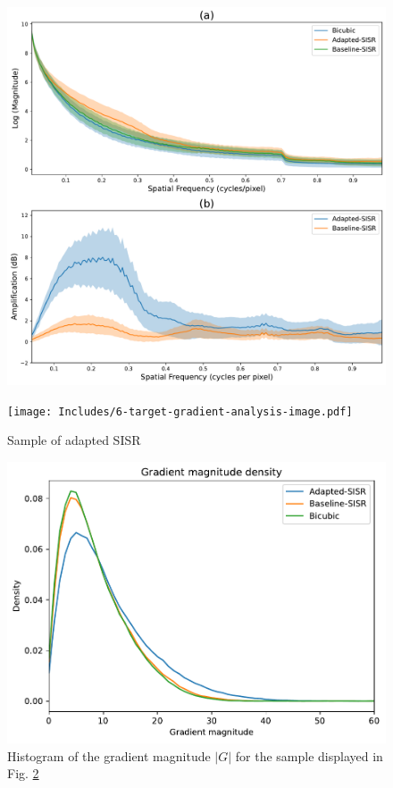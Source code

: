         \begin{figure}[H]
            \centering
            \includegraphics[scale=0.5]{Includes/5-target-amplification-statistics.pdf}
            \caption{}
            \label{fig:6-target-amplification-statistics}
        \end{figure}

        \begin{figure}[H]
            \centering
            \texttt{[image: Includes/6-target-gradient-analysis-image.pdf]}
            \caption{Sample of adapted SISR}
            \label{fig:6-target-gradient-analysis-image}
        \end{figure}

        \begin{figure}[H]
            \centering
            \includegraphics[scale=0.6]{Includes/6-target-gradient-analysis-histogram.pdf}
            \caption{Histogram of the gradient magnitude $|G|$ for the sample displayed in Fig. \ref{fig:6-target-gradient-analysis-image}}
            \label{fig:6-target-gradient-analysis-histogram}
        \end{figure}


